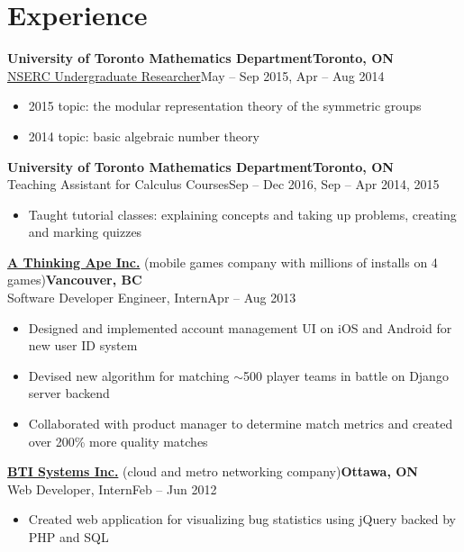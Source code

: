 \documentclass[10pt,letterpaper]{article}
\newcommand*\textmb[1]{\fontseries{b}\selectfont#1\fontseries{m}\selectfont}
\newcommand*\company[1]{\textbf{#1}}
\newcommand*\position[1]{\textmb{#1}}
\newcommand*\location\company
\newcommand*\timespan\position
\begin{document}
\section*{Experience}
\company{University of Toronto Mathematics Department}\hfill\location{Toronto, ON}\\
\position{\href{http://www.nserc-crsng.gc.ca/Students-Etudiants/UG-PC/USRA-BRPC_eng.asp}{NSERC Undergraduate Researcher}}\hfill\timespan{May -- Sep 2015, Apr -- Aug 2014}
\begin{itemize}
\item 2015 topic: the modular representation theory of the symmetric groups
\item 2014 topic: basic algebraic number theory
\end{itemize}
\company{University of Toronto Mathematics Department}\hfill\location{Toronto, ON}\\
\position{Teaching Assistant for Calculus Courses}\hfill\timespan{Sep -- Dec 2016, Sep -- Apr 2014, 2015}
\begin{itemize}
\item Taught tutorial classes: explaining concepts and taking up problems, creating and marking quizzes
\end{itemize}
\company{\href{http://www.athinkingape.com/}{A Thinking Ape Inc.}} (mobile games company with millions of installs on 4 games)\hfill\location{Vancouver, BC}\\
\position{Software Developer Engineer, Intern}\hfill\timespan{Apr -- Aug 2013}
\begin{itemize}
\item Designed and implemented account management UI on iOS and Android for new user ID system
\item Devised new algorithm for matching \(\sim\)500 player teams in battle on Django server backend
\item Collaborated with product manager to determine match metrics and created over 200\% more quality matches
\end{itemize}
\company{\href{http://www.juniper.net/us/en/dm/bti/}{BTI Systems Inc.}} (cloud and metro networking company)\hfill\location{Ottawa, ON}\\
\position{Web Developer, Intern}\hfill\timespan{Feb -- Jun 2012}
\begin{itemize}
\item Created web application for visualizing bug statistics using jQuery backed by PHP and SQL
\end{itemize}
\end{document}
